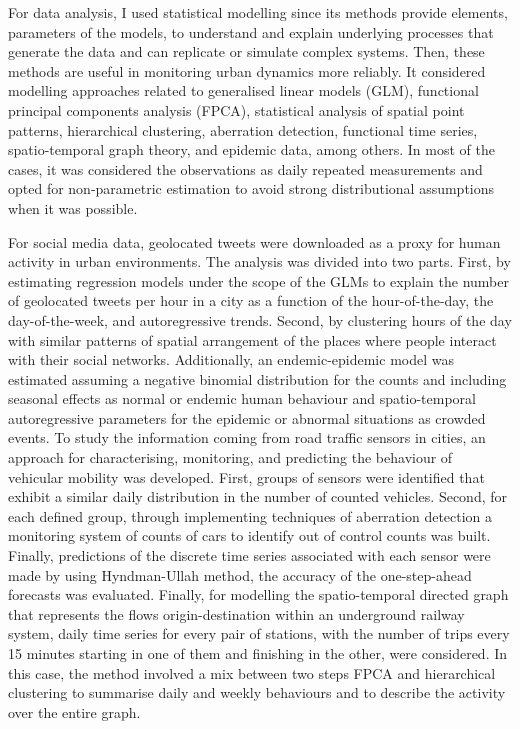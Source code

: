 \documentclass[11pt, a4paper]{awesome-cv}
\begin{document}
\begin{cvletter}
For data analysis, I used statistical modelling since its methods provide elements, parameters of the models, to understand and explain underlying processes that generate the data and can replicate or simulate complex systems. Then, these methods are useful in monitoring urban dynamics more reliably. It considered modelling approaches related to generalised linear models (GLM), functional principal components analysis (FPCA), statistical analysis of spatial point patterns, hierarchical clustering, aberration detection, functional time series, spatio-temporal graph theory, and epidemic data, among others. In most of the cases, it was considered the observations as daily repeated measurements and opted for non-parametric estimation to avoid strong distributional assumptions when it was possible.\par
For social media data, geolocated tweets were downloaded as a proxy for human activity in urban environments. The analysis was divided into two parts. First, by estimating regression models under the scope of the GLMs to explain the number of geolocated tweets per hour in a city as a function of the hour-of-the-day, the day-of-the-week, and autoregressive trends. Second, by clustering hours of the day with similar patterns of spatial arrangement of the places where people interact with their social networks. Additionally, an endemic-epidemic model was estimated assuming a negative binomial distribution for the counts and including seasonal effects as normal or endemic human behaviour and spatio-temporal autoregressive parameters for the epidemic or abnormal situations as crowded events. To study the information coming from road traffic sensors in cities, an approach for characterising, monitoring, and predicting the behaviour of vehicular mobility was developed. First, groups of sensors were identified that exhibit a similar daily distribution in the number of counted vehicles. Second, for each defined group, through implementing techniques of aberration detection a monitoring system of counts of cars to identify out of control counts was built. Finally, predictions of the discrete time series associated with each sensor were made by using Hyndman-Ullah method, the accuracy of the one-step-ahead forecasts was evaluated. Finally, for modelling the spatio-temporal directed graph that represents the flows origin-destination within an underground railway system, daily time series for every pair of stations, with the number of trips every 15 minutes starting in one of them and finishing in the other, were considered. In this case, the method involved a mix between two steps FPCA and hierarchical clustering to summarise daily and weekly behaviours and to describe the activity over the entire graph.\par

\end{cvletter}
\end{document}
